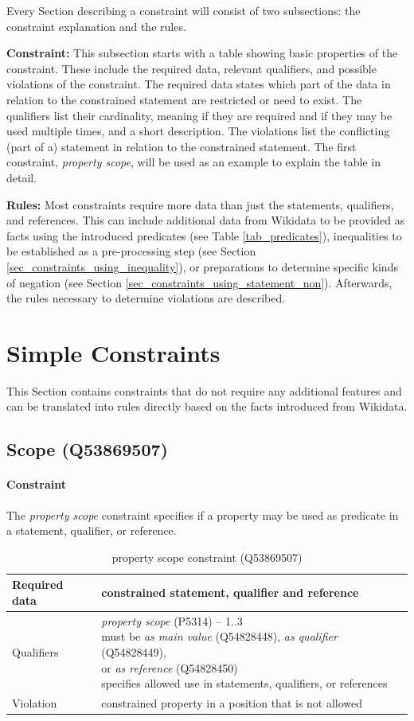 \documentclass[hyperref,bachelorofscience,fleqn]{cgvpub}
\begin{document}
Every Section describing a constraint will consist of two subsections: the constraint explanation and the rules.

{\bf Constraint:} This subsection starts with a table showing basic properties of the constraint. These include the required data, relevant qualifiers, and possible violations of the constraint. The required data states which part of the data in relation to the constrained statement are restricted or need to exist. The qualifiers list their cardinality, meaning if they are required and if they may be used multiple times, and a short description. The violations list the conflicting (part of a) statement in relation to the constrained statement. The first constraint, \emph{property scope}, will be used as an example to explain the table in detail.

{\bf Rules:} Most constraints require more data than just the statements, qualifiers, and references. This can include additional data from Wikidata to be provided as facts using the introduced predicates (see Table \ref{tab_predicates}), inequalities to be established as a pre-processing step (see Section \ref{sec_constraints_using_inequality}), or preparations to determine specific kinds of negation (see Section \ref{sec_constraints_using_statement_non}). Afterwards, the rules necessary to determine violations are described.

\section{Simple Constraints}\label{sec_simple_constraints}
This Section contains constraints that do not require any additional features and can be translated into rules directly based on the facts introduced from Wikidata.

\subsection{Scope (Q53869507)}
\paragraph{Constraint}
The \emph{property scope} constraint specifies if a property may be used as predicate in a statement, qualifier, or reference.
\begin{table}[H]
\caption{property scope constraint (Q53869507)}
\begin{tabularx}{\textwidth}{ ll X}
\hline
Required data & constrained statement, qualifier and reference \\
\hline
Qualifiers & \makecell{\emph{property scope} (P5314) -- 1..3 \\ must be \emph{as main value} (Q54828448), \emph{as qualifier} (Q54828449), \\ or \emph{as reference} (Q54828450) \\ specifies allowed use in statements, qualifiers, or references} \\
\hline
Violation & constrained property in a position that is not allowed \\
\hline
\end{tabularx}
\end{table}
\end{document}
